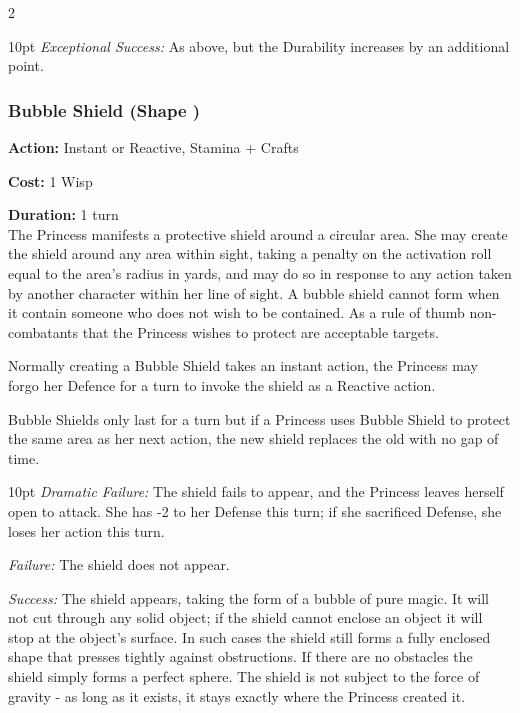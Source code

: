 \begin{multicols}{2}
\begin{myindentpar}{10pt}
\emph{Exceptional Success:} As above, but the Durability increases by an additional point.

\end{myindentpar}

\subsubsection*{Bubble Shield (Shape \textbullet)}

\noindent \textbf{Action:} Instant or Reactive, Stamina + Crafts

\noindent \textbf{Cost:} 1 Wisp

\noindent \textbf{Duration:} 1 turn \\

\noindent The Princess manifests a protective shield around a circular area. She may create the shield around any area within sight, taking a penalty on the activation roll equal to the area’s radius in yards, and may do so in
response to any action taken by another character within her line of sight. A bubble shield cannot form when it contain someone who does not wish to be contained. As a rule of thumb non-combatants that the Princess wishes to protect are acceptable targets. 

Normally creating a Bubble Shield takes an instant action, the Princess may forgo her Defence for a turn to invoke the shield as a Reactive action. 

Bubble Shields only last for a turn but if a Princess uses Bubble Shield to protect the same area as her next action, the new shield replaces the old with no gap of time.

\begin{myindentpar}{10pt}    \emph{Dramatic Failure:} The shield fails to appear, and the Princess leaves herself open to attack. She has -2 to her Defense this turn; if she sacrificed Defense, she loses her action this turn.

\emph{Failure:} The shield does not appear.

\emph{Success:} The shield appears, taking the form of a bubble of pure magic. It will not cut through any solid object; if the shield cannot enclose an object it will stop at the object’s surface. In such cases the shield still forms a fully enclosed shape that presses tightly against obstructions. If there are no obstacles the shield simply forms a perfect sphere. The shield is not subject to the force of gravity - as long as it exists, it stays exactly where the Princess created it.


\end{myindentpar}
\end{multicols}
